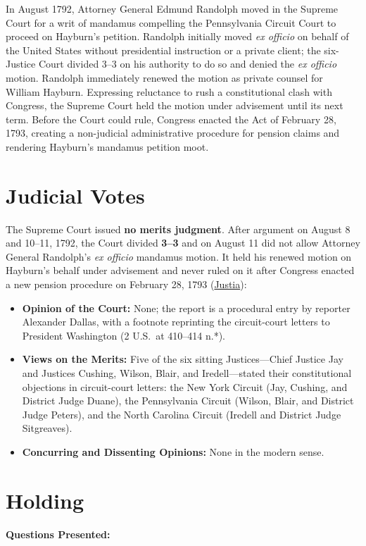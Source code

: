 \documentclass[12pt]{article}
\begin{document}
In August 1792, Attorney General Edmund Randolph moved in the Supreme Court for a writ of mandamus compelling the Pennsylvania Circuit Court to proceed on Hayburn's petition. Randolph initially moved \textit{ex officio} on behalf of the United States without presidential instruction or a private client; the six-Justice Court divided 3--3 on his authority to do so and denied the \textit{ex officio} motion. Randolph immediately renewed the motion as private counsel for William Hayburn. Expressing reluctance to rush a constitutional clash with Congress, the Supreme Court held the motion under advisement until its next term. Before the Court could rule, Congress enacted the Act of February 28, 1793, creating a non-judicial administrative procedure for pension claims and rendering Hayburn's mandamus petition moot.

\section{Judicial Votes}
The Supreme Court issued \textbf{no merits judgment}. After argument on August 8 and 10--11, 1792, the Court divided \textbf{3--3} and on August 11 did not allow Attorney General Randolph's \textit{ex officio} mandamus motion. It held his renewed motion on Hayburn's behalf under advisement and never ruled on it after Congress enacted a new pension procedure on February 28, 1793 (\href{https://supreme.justia.com/cases/federal/us/2/409/}{Justia}):

\begin{itemize}
    \item \textbf{Opinion of the Court:} None; the report is a procedural entry by reporter Alexander Dallas, with a footnote reprinting the circuit-court letters to President Washington (2 U.S.\ at 410--414 n.*).
    \item \textbf{Views on the Merits:} Five of the six sitting Justices---Chief Justice Jay and Justices Cushing, Wilson, Blair, and Iredell---stated their constitutional objections in circuit-court letters: the New York Circuit (Jay, Cushing, and District Judge Duane), the Pennsylvania Circuit (Wilson, Blair, and District Judge Peters), and the North Carolina Circuit (Iredell and District Judge Sitgreaves).
    \item \textbf{Concurring and Dissenting Opinions:} None in the modern sense.
\end{itemize}

\section{Holding}
\textbf{Questions Presented:}
\end{document}
